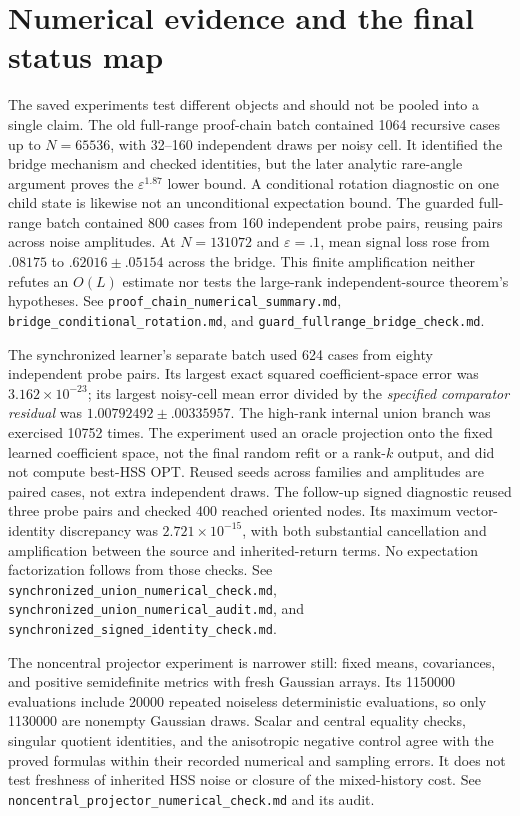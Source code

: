 \documentclass[11pt,oneside,openany,a4paper]{book}
\numberwithin{equation}{chapter}
\theoremstyle{definition}
\theoremstyle{remark}
\newcommand{\sourcefile}[1]{{\small\nolinkurl{#1}}}
\begin{document}
\section{Numerical evidence and the final status map}
\label{upd:sec:later-status}

The saved experiments test different objects and should not be pooled
into a single claim.  The old full-range proof-chain batch contained
1064 recursive cases up to $N=65536$, with 32--160 independent draws
per noisy cell.  It identified the bridge mechanism and checked
identities, but the later analytic rare-angle argument proves the
$\varepsilon^{1.87}$ lower bound.  A conditional rotation diagnostic
on one child state is likewise not an unconditional expectation bound.
The guarded full-range batch contained 800 cases from 160 independent
probe pairs, reusing pairs across noise amplitudes.  At $N=131072$ and
$\varepsilon=.1$, mean signal loss rose from $.08175$ to
$.62016\pm.05154$ across the bridge.  This finite amplification neither
refutes an $O(L)$ estimate nor tests the large-rank independent-source
theorem's hypotheses.  See \sourcefile{proof_chain_numerical_summary.md},
\sourcefile{bridge_conditional_rotation.md}, and
\sourcefile{guard_fullrange_bridge_check.md}.

The synchronized learner's separate batch used 624 cases from eighty
independent probe pairs.  Its largest exact squared coefficient-space
error was $3.162\times10^{-23}$; its largest noisy-cell mean error
divided by the \emph{specified comparator residual} was
$1.00792492\pm.00335957$.  The high-rank internal union branch was
exercised 10752 times.  The experiment used an oracle projection onto
the fixed learned coefficient space, not the final random refit or a
rank-$k$ output, and did not compute best-HSS OPT.  Reused seeds across
families and amplitudes are paired cases, not extra independent draws.
The follow-up signed diagnostic reused three probe pairs and checked
400 reached oriented nodes.  Its maximum vector-identity discrepancy
was $2.721\times10^{-15}$, with both substantial cancellation and
amplification between the source and inherited-return terms.  No
expectation factorization follows from those checks.
See \sourcefile{synchronized_union_numerical_check.md},
\sourcefile{synchronized_union_numerical_audit.md}, and
\sourcefile{synchronized_signed_identity_check.md}.

The noncentral projector experiment is narrower still: fixed means,
covariances, and positive semidefinite metrics with fresh Gaussian
arrays.  Its 1150000 evaluations include 20000 repeated noiseless
deterministic evaluations, so only 1130000 are nonempty Gaussian draws.
Scalar and central equality checks, singular quotient identities, and
the anisotropic negative control agree with the proved formulas within
their recorded numerical and sampling errors.  It does not test
freshness of inherited HSS noise or closure of the mixed-history cost.
See \sourcefile{noncentral_projector_numerical_check.md} and its audit.
\end{document}
